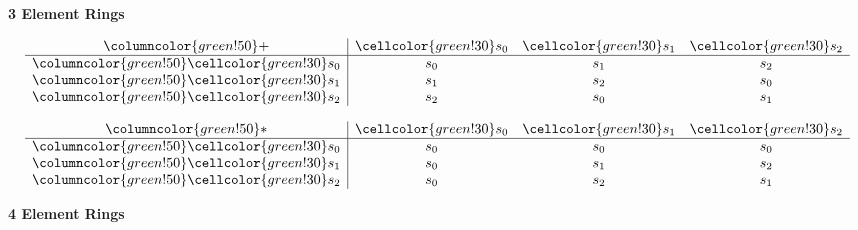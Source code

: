 \documentclass{article}
\begin{document}
\vspace{0.25cm}
\begin{center}
\textbf{3 Element Rings}
\end{center}
\begin{center}
\begin{minipage}{0.28\textwidth}
    \centering
    \renewcommand{\arraystretch}{1.5} 
    \[
    \begin{array}{>{\columncolor{green!50}}c|ccc}
    + & \cellcolor{green!30}s_0 & \cellcolor{green!30}s_1 & \cellcolor{green!30}s_2 \\ \hline
    \cellcolor{green!30}s_0 & s_0 & s_1 & s_2 \\
    \cellcolor{green!30}s_1 & s_1 & s_2 & s_0 \\
    \cellcolor{green!30}s_2 & s_2 & s_0 & s_1 \\
    \end{array}
    \]
\end{minipage}%
\begin{minipage}{0.28\textwidth}
    \centering
    \renewcommand{\arraystretch}{1.5} 
    \[
    \begin{array}{>{\columncolor{green!50}}c|ccc}
    * & \cellcolor{green!30}s_0 & \cellcolor{green!30}s_1 & \cellcolor{green!30}s_2 \\ \hline
    \cellcolor{green!30}s_0 & s_0 & s_0 & s_0 \\
    \cellcolor{green!30}s_1 & s_0 & s_1 & s_2 \\
    \cellcolor{green!30}s_2 & s_0 & s_2 & s_1 \\
    \end{array}
    \]
\end{minipage}
\end{center}

\vspace{0.25cm}
\begin{center}
\textbf{4 Element Rings}
\end{center}
\end{document}
